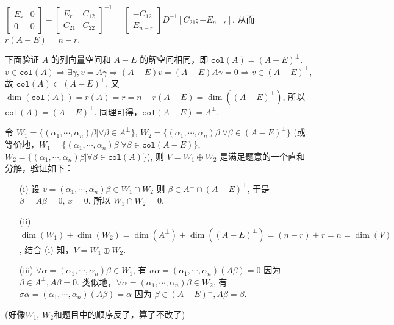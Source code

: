 \documentclass{article}
\begin{document}
\begin{spacing}{1.5}
\begin{itemize}
\begin{itemize}
\begin{itemize}
            $\left[\begin{array}{cc}E_r&0\\0&0\end{array}\right] - \left[\begin{array}{cc}E_r&C_{12}\\C_{21}&C_{22}\end{array}\right]^{-1}=\left[\begin{array}{c}-C_{12}\\E_{n-r}\end{array}\right] D^{-1} \left[C_{21}; -E_{n-r}\right]$, 从而 $r(A-E) = n-r$.

            下面验证 $A$ 的列向量空间和 $A-E$ 的解空间相同，即 $\mathtt{col}(A) = (A-E)^\perp$. $v\in \mathtt{col}(A)\Rightarrow \exists \gamma, v = A\gamma \Rightarrow (A-E)v = (A-E)A\gamma = 0 \Rightarrow v\in (A-E)^\perp$, 故 $\mathtt{col}(A)\subset (A-E)^\perp$. 又 $\dim(\mathtt{col}(A)) = r(A) = r = n - r(A-E) = \dim\left((A-E)^\perp\right)$, 所以 $\mathtt{col}(A) = (A-E)^\perp$. 同理可得，$\mathtt{col}(A-E) = A^\perp$.

            令 $W_1 = \{(\alpha_1,\cdots,\alpha_n)\beta | \forall \beta\in A^{\perp}\}$, $W_2 = \{(\alpha_1, \cdots, \alpha_n)\beta | \forall \beta\in (A-E)^\perp\}$ (或等价地，$W_1 = \{(\alpha_1,\cdots,\alpha_n)\beta | \forall \beta\in \mathtt{col}(A-E)\}$, $W_2 = \{(\alpha_1, \cdots, \alpha_n)\beta | \forall \beta\in \mathtt{col}(A)\}$), 则 $V = W_1 \oplus W_2$ 是满足题意的一个直和分解，验证如下：
            \begin{itemize}
                \item [(i)] 设 $v = (\alpha_1,\cdots,\alpha_n)\beta\in W_1\cap W_2$ 则 $\beta \in A^\perp \cap (A-E)^\perp$, 于是 $\beta = A\beta = 0$, $x = 0$. 所以 $W_1 \cap W_2 = 0$.
                \item [(ii)] $\dim(W_1) + \dim(W_2) = \dim(A^\perp) + \dim((A-E)^\perp) = (n - r) + r = n = \dim (V)$, 结合 (i) 知，$V = W_1 \oplus W_2$.
                \item [(iii)] $\forall \alpha = (\alpha_1,\cdots,\alpha_n)\beta\in W_1$, 有 $\sigma \alpha = (\alpha_1,\cdots,\alpha_n) (A\beta) = 0$ 因为 $\beta\in A^\perp, A\beta=0$. 类似地，$\forall \alpha = (\alpha_1,\cdots,\alpha_n)\beta \in W_2$, 有 $\sigma \alpha = (\alpha_1, \cdots, \alpha_n) (A\beta) = \alpha$ 因为 $\beta\in (A-E)^\perp, A\beta = \beta$. 
            \end{itemize}
            (好像$W_1$, $W_2$和题目中的顺序反了，算了不改了)
        \end{itemize}
    \end{itemize}


\end{itemize}
\end{spacing}
\end{document}

